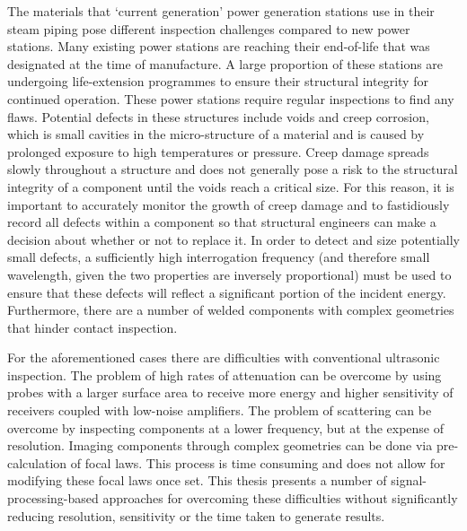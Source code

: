 The materials that `current generation' power generation stations use in their steam piping pose different inspection challenges compared to new power stations. Many existing power stations are reaching their end-of-life that was designated at the time of manufacture\cite{de_witte_power_1989}. A large proportion of these stations are undergoing life-extension programmes to ensure their structural integrity for continued operation\cite{thomas_power-plant_1988,dominelli_life_2006,ellerman_note_1998}. These power stations require regular inspections to find any flaws\cite{ray_residual_2000}. Potential defects in these structures include voids and creep corrosion, which is small cavities in the micro-structure of a material and is caused by prolonged exposure to high temperatures or pressure\cite{tong_creep_2001}. Creep damage spreads slowly throughout a structure and does not generally pose a risk to the structural integrity of a component until the voids reach a critical size\cite{rice_mechanics_1976}. For this reason, it is important to accurately monitor the growth of creep damage and to fastidiously record all defects within a component so that structural engineers can make a decision about whether or not to replace it\cite{saniie_life_1990}. In order to detect and size potentially small defects, a sufficiently high interrogation frequency (and therefore small wavelength, given the two properties are inversely proportional) must be used to ensure that these defects will reflect a significant portion of the incident energy\cite{sehgal_diffraction_1984,sposito_review_2010}. Furthermore, there are a number of welded components with complex geometries that hinder contact inspection.

For the aforementioned cases there are difficulties with conventional ultrasonic inspection. The problem of high rates of attenuation can be overcome by using probes with a larger surface area to receive more energy and higher sensitivity of receivers coupled with low-noise amplifiers\cite{drinkwater_ultrasonic_2006}. The problem of scattering can be overcome by inspecting components at a lower frequency, but at the expense of resolution. Imaging components through complex geometries can be done via pre-calculation of focal laws. This process is time consuming and does not allow for modifying these focal laws once set. This thesis presents a number of signal-processing-based approaches for overcoming these difficulties without significantly reducing resolution, sensitivity or the time taken to generate results.



